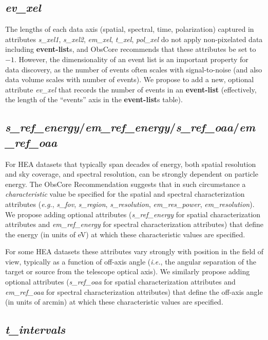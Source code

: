 \documentclass[11pt,a4paper]{ivoa}
\begin{document}
\subsection{{\em ev\_xel}}

The lengths of each data axis (spatial, spectral, time, polarization) captured in attributes {\em s\_xel1\/}, {\em s\_xel2\/}, {\em em\_xel\/}, {\em t\_xel\/}, {\em pol\_xel\/} do not apply non-pixelated data including {\bf event-list}s, and ObsCore recommends that these attributes be set to $-1$.  However, the dimensionality of an event list is an important property for data discovery, as the number of events often scales with signal-to-noise (and also data volume scales with number of events).  We propose to add a new, optional attribute {\em ev\_xel\/} that records the number of events in an {\bf event-list} (effectively, the length of the ``events'' axis in the {\bf event-list}s table).

\subsection{{\em s\_ref\_energy\/}/{\em em\_ref\_energy\/}/{\em s\_ref\_oaa\/}/{\em em\_ref\_oaa}}

For HEA datasets that typically span decades of energy, both spatial resolution and sky coverage, and spectral resolution, can be strongly dependent on particle energy.  The ObsCore Recommendation suggests that in such circumstance a {\em characteristic\/} value be specified for the spatial and spectral characterization attributes ({\em e.g.\/}, {\em s\_fov\/}, {\em s\_region\/}, {\em s\_resolution\/}, {\em em\_res\_power\/}, {\em em\_resolution\/}).  We propose adding optional attributes ({\em s\_ref\_energy\/} for spatial characterization attributes and {\em em\_ref\_energy\/} for spectral characterization attributes) that define the energy (in units of eV) at which these characteristic values are specified.

For some HEA datasets these attributes vary strongly with position in the field of view, typically as a function of off-axis angle ({\em i.e.\/}, the angular separation of the target or source from the telescope optical axis). We similarly propose adding optional attributes ({\em s\_ref\_oaa\/} for spatial characterization attributes and {\em em\_ref\_oaa\/} for spectral characterization attributes) that define the off-axis angle (in units of arcmin) at which these characteristic values are specified.

\subsection{{\em t\_intervals}}
\end{document}
